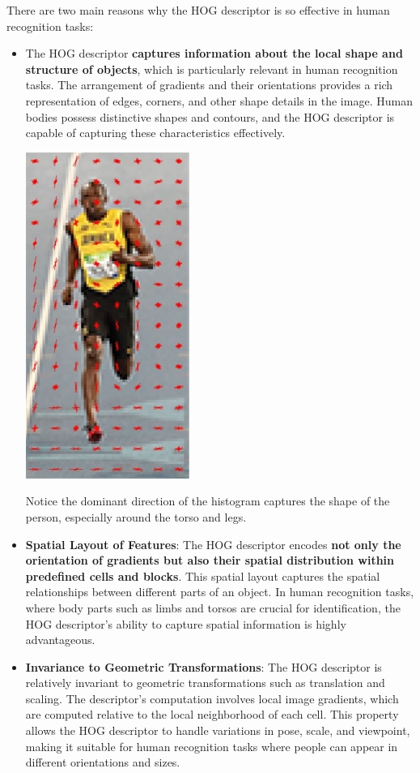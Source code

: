 \documentclass{article}
\begin{document}
\newpage

There are two main reasons why the HOG descriptor is so effective in human recognition tasks:

\begin{itemize}
    \item The HOG descriptor \textbf{captures information about the local shape and structure of objects}, which is particularly relevant in human recognition tasks. The arrangement of gradients and their orientations provides a rich representation of edges, corners, and other shape details in the image. Human bodies possess distinctive shapes and contours, and the HOG descriptor is capable of capturing these characteristics effectively.

    \begin{center}
        \includegraphics[width=.2\linewidth]{images/human.jpg}    
    \end{center}

    Notice the dominant direction of the histogram captures the shape of the person, especially around the torso and legs.
    
    \item \textbf{Spatial Layout of Features}: The HOG descriptor encodes \textbf{not only the orientation of gradients but also their spatial distribution within predefined cells and blocks}. This spatial layout captures the spatial relationships between different parts of an object. In human recognition tasks, where body parts such as limbs and torsos are crucial for identification, the HOG descriptor's ability to capture spatial information is highly advantageous.

    \item \textbf{Invariance to Geometric Transformations}: The HOG descriptor is relatively invariant to geometric transformations such as translation and scaling. The descriptor's computation involves local image gradients, which are computed relative to the local neighborhood of each cell. This property allows the HOG descriptor to handle variations in pose, scale, and viewpoint, making it suitable for human recognition tasks where people can appear in different orientations and sizes.
\end{itemize}
\end{document}

